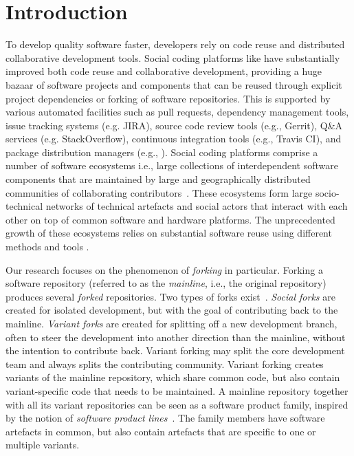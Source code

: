 
\section{Introduction}
To develop quality software faster, developers rely on code reuse and distributed collaborative development tools. Social coding platforms like \gh have substantially improved  both code reuse and collaborative development, providing a huge bazaar of software projects and components that can be reused through explicit project dependencies or forking of software repositories. This is supported by various automated facilities such as pull requests, dependency management tools, issue tracking systems (e.g. \textsf{JIRA}), source code review tools (e.g., \textsf{Gerrit}), Q\&A services (e.g. \textsf{StackOverflow}), continuous integration tools (e.g., \textsf{Travis CI}), and package distribution managers (e.g., \np). Social coding platforms comprise a number of software ecosystems i.e., large collections of interdependent software components that are maintained by large and geographically distributed communities of collaborating contributors~\cite{lungu:2008,decan:2017}.
These ecosystems form large socio-technical networks of technical artefacts and social actors that interact with each other on top of common software and hardware platforms.
The unprecedented growth of these ecosystems relies on substantial software reuse using different methods and tools \cite{mojica2014large}.

Our research focuses on the phenomenon of {\em forking} in particular. Forking a software repository (referred to as the \textit{mainline}, i.e., the original repository) produces several \textit{forked} repositories.
Two types of forks exist~\cite{Zhou:2020}. \textit{Social forks} are created for isolated development, but with the goal of contributing back to the mainline.
\textit{Variant forks} are created for splitting off a new development branch, often to steer the development into another direction than the mainline, without the intention to contribute back.
Variant forking may split the core development team and always splits the contributing community.
Variant forking creates variants of the mainline repository, which share common code, but also contain variant-specific code that needs to be maintained.
A mainline repository together with all its variant repositories can be seen as a software product family, inspired by the notion of \textit{software product lines}~\cite{berger.ea:2020:emse}.
The  family members have software artefacts in common, but also contain artefacts that are specific to one or multiple variants.

